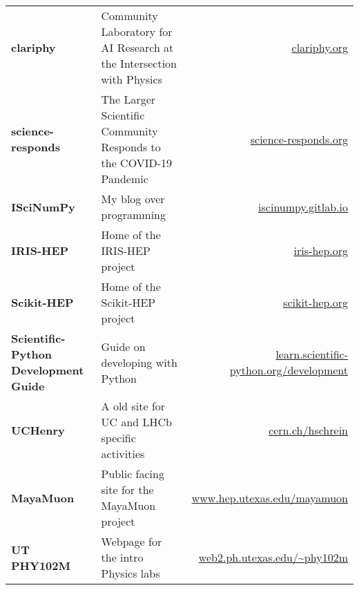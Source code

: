 \documentclass[10pt,letterpaper]{moderncv}
\begin{document}
\begin{tabularx}{\textwidth}{>{\bfseries}p{1.45in}Xr}
clariphy & Community Laboratory for AI Research at the Intersection with Physics & \url{clariphy.org} \\
science-responds & The Larger Scientific Community Responds to the COVID-19 Pandemic & \url{science-responds.org} \\
ISciNumPy & My blog over programming & \url{iscinumpy.gitlab.io} \\
IRIS-HEP & Home of the IRIS-HEP project & \url{iris-hep.org} \\
Scikit-HEP & Home of the Scikit-HEP project & \url{scikit-hep.org} \\
Scientific-Python Development Guide & Guide on developing with Python & \url{learn.scientific-python.org/development} \\
UCHenry & A old site for UC and LHCb specific activities & \url{cern.ch/hschrein}  \\
MayaMuon & Public facing site for the MayaMuon project & \url{www.hep.utexas.edu/mayamuon} \\
UT PHY102M & Webpage for the intro Physics labs & \url{web2.ph.utexas.edu/~phy102m}  \\
\end{tabularx}


\end{document}
